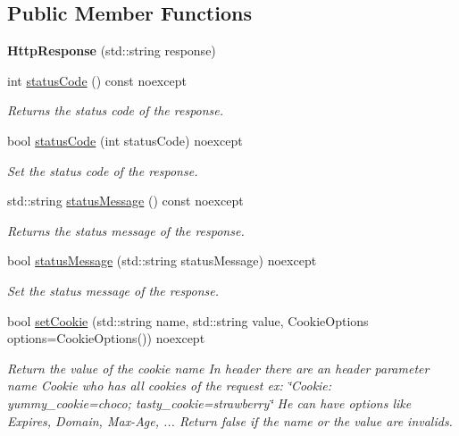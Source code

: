 \subsection*{Public Member Functions}
\begin{DoxyCompactItemize}
\item 
\mbox{\label{classHttpResponse_a6b135899b9658fda70a4b81b2454382c}} 
{\bfseries Http\+Response} (std\+::string response)
\item 
int \hyperlink{classHttpResponse_a5cb28c82fc2f657808b61f0f6bb67f28}{status\+Code} () const noexcept
\begin{DoxyCompactList}\small\item\em Returns the status code of the response. \end{DoxyCompactList}\item 
bool \hyperlink{classHttpResponse_a8a6cc8f27e81ca4d2ef4ec60450974d1}{status\+Code} (int status\+Code) noexcept
\begin{DoxyCompactList}\small\item\em Set the status code of the response. \end{DoxyCompactList}\item 
std\+::string \hyperlink{classHttpResponse_a5463015a6d521c4c4da46505c0740f63}{status\+Message} () const noexcept
\begin{DoxyCompactList}\small\item\em Returns the status message of the response. \end{DoxyCompactList}\item 
bool \hyperlink{classHttpResponse_ad705d5d1846c261e2ca80c24c9e1d75c}{status\+Message} (std\+::string status\+Message) noexcept
\begin{DoxyCompactList}\small\item\em Set the status message of the response. \end{DoxyCompactList}\item 
\mbox{\label{classHttpResponse_a2f6f0f1588f9a06c360648cabb6e58e1}} 
bool \hyperlink{classHttpResponse_a2f6f0f1588f9a06c360648cabb6e58e1}{set\+Cookie} (std\+::string name, std\+::string value, Cookie\+Options options=Cookie\+Options()) noexcept
\begin{DoxyCompactList}\small\item\em Return the value of the cookie \textquotesingle{}name\textquotesingle{} In header there are an header parameter name \textquotesingle{}Cookie\textquotesingle{} who has all cookies of the request ex\+: \char`\"{}\+Cookie\+: yummy\+\_\+cookie=choco; tasty\+\_\+cookie=strawberry\char`\"{} He can have options like Expires, Domain, Max-\/\+Age, ... Return false if the name or the value are invalids. \end{DoxyCompactList}\item 

\end{DoxyCompactItemize}

